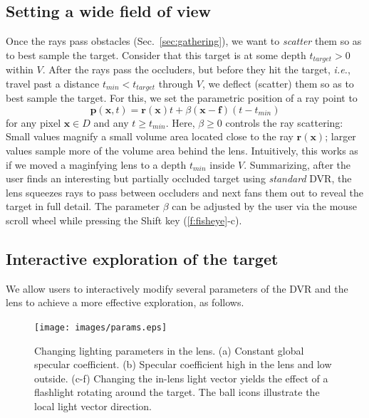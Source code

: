 \subsection{Setting a wide field of view}
\label{sec:scattering}
%
Once the rays pass obstacles (Sec.~\ref{sec:gathering}), we want to \emph{scatter} them so as to best sample the target. Consider that this target is at some depth $t_{target}>0$ within $V$. After the rays pass the occluders, but before they hit the target, \emph{i.e.}, travel past a distance $t_{min} < t_{target}$ through $V$, we deflect (scatter) them so as to best sample the target. For this, we set the parametric position of a ray point to
%
\begin{equation}
\mathbf{p}(\mathbf{x}, t) = \mathbf{r}(\mathbf{x})t + \beta (\mathbf{x}-\mathbf{f})(t-t_{min})
\label{eqn:scattering}
\end{equation}
%
for any pixel $\mathbf{x} \in D$ and any $t \geq t_{min}$. Here, $\beta \geq 0$ controls the ray scattering: Small values magnify a small volume area located close to the ray $\mathbf{r}(\mathbf{x})$; larger values sample more of the volume area behind the lens. Intuitively, this works as if we moved a maginfying lens to a depth $t_{min}$ inside $V$. Summarizing, after the user finds an interesting but partially occluded target using \emph{standard} DVR, the lens squeezes rays to pass between occluders and next fans them out to reveal the target in full detail. The parameter $\beta$ can be adjusted by the user via the mouse scroll wheel while pressing the Shift key (\autoref{f:fisheye}-c).
%
%

\vspace{-0.15cm}
\subsection{Interactive exploration of the target}
\label{sec:inter_expl}
%
We allow users to interactively modify several parameters of the DVR and the lens to achieve a more effective exploration, as follows.

%
\begin{figure}[htbp]
\centering
\vspace{-0.15cm}
\texttt{[image: images/params.eps]}
\vspace{-0.15cm}
\caption{Changing lighting parameters in the lens. (a) Constant global specular coefficient. (b) Specular coefficient high in the lens and low outside. (c-f) Changing the in-lens light vector yields the effect of a flashlight rotating around the target. The ball icons illustrate the local light vector direction.}
\label{f:params}
\vspace{-0.15cm}
\end{figure}
%


